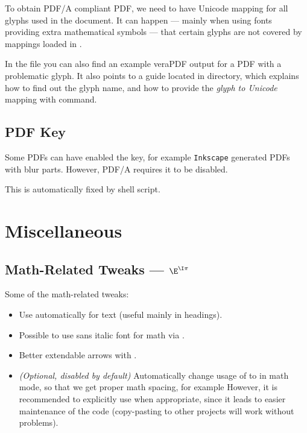 To obtain PDF/A compliant PDF, we need to have Unicode mapping for all glyphs used in the document.
It can happen --- mainly when using fonts providing extra mathematical symbols --- that certain glyphs are not covered by mappings loaded in .

In the  file you can also find an example \textsf{veraPDF} output for a PDF with a problematic glyph.
It also points to a guide located in  directory, which explains how to find out the glyph name, and how to provide the \emph{glyph to Unicode} mapping with \macro{\pdfglyphtounicode} command.


\subsection{PDF \texorpdfstring{}{/Interpolation} Key}%
\label{sub:PDF Interpolation Key}

Some PDFs can have enabled the  key, for example \texttt{Inkscape} generated PDFs with blur parts.
However, PDF/A requires it to be disabled.

This is automatically fixed by  shell script.


\section{Miscellaneous}%
\label{sec:Miscellaneous}

\subsection{Math-Related Tweaks --- \texorpdfstring{\rmfamily\(\E^{\I\pi}\)}{exp(iπ)}}%
\label{sub:Math Macros}

Some of the math-related tweaks:
\begin{itemize}
    \item Use \macro{\boldmath} automatically for \macro{\textbf} text (useful mainly in headings).
    \item Possible to use sans italic font for math via \custommacro{\mathsfit}.
    \item Better extendable arrows with .
    \item \emph{(Optional, disabled by default)} Automatically change usage of \macro{\textcolor} to \macro{\mathcolor} in math mode, so that we get proper math spacing, for example
          However, it is recommended to explicitly use \macro{\mathcolor} when appropriate, since it leads to easier maintenance of the code (copy-pasting to other projects will work without problems).
\end{itemize}

